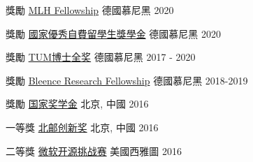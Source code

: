 




\begin{cvhonors}

\cvhonor
{獎勵} %
{\href{https://fellowship.mlh.io/}{MLH Fellowship} } %
{德國慕尼黑} %
{2020} %

\cvhonor
{獎勵} %
{\href{}{國家優秀自費留學生獎學金} } %
{德國慕尼黑} %
{2020} %

\cvhonor
{獎勵} %
{\href{}{TUM博士全奖} } %
{德國慕尼黑} %
{2017 - 2020} %

\cvhonor
{獎勵} %
{\href{https://bleenco.com/}{Bleence Research Fellowship} } %
{德國慕尼黑} %
{2018-2019} %

\cvhonor
{獎勵} %
{\href{http://sice.bupt.edu.cn/info/1008/1546.htm}{国家奖学金}} %
{北京, 中國} %
{2016} %

\cvhonor
{一等獎} %
{\href{http://my.bupt.edu.cn/detach.portal?.pmn=view&action=browser&.ia=false&.pen=pe1144&bulletinId=fc089be9-6d81-11e6-ae27-4f4915a784ea}{北邮创新奖}} %
{北京, 中國} %
{2016} %


\cvhonor
{二等獎} %
{\href{https://www.microsoft.com/en-us/research/academic-program/microsoft-open-source-challenge/}{微软开源挑战赛}} %
{美國西雅圖} %
{2016} %



\end{cvhonors}
